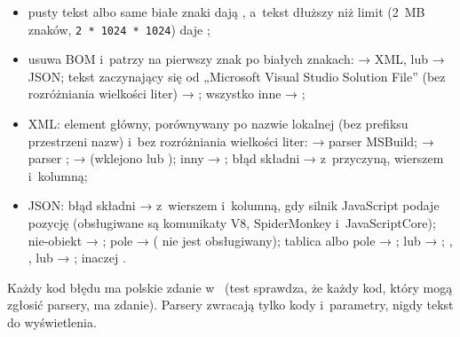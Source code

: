 \begin{itemize}
  \item pusty tekst albo same białe znaki dają , a~tekst dłuższy niż
        limit  (2~MB znaków, \texttt{2 * 1024 * 1024}) daje
        ;
  \item usuwa BOM i~patrzy na pierwszy znak po białych znakach: \repopath{<} → XML,
        \repopath{\{} lub \repopath{[} → JSON; tekst zaczynający się od
        „Microsoft Visual Studio Solution File” (bez rozróżniania wielkości liter) →
        ; wszystko inne → ;
  \item XML: element główny, porównywany po nazwie lokalnej (bez prefiksu przestrzeni nazw)
        i~bez rozróżniania wielkości liter:  → parser MSBuild;  → parser
        ;  → 
        (wklejono  lub ); inny →
        ; błąd składni →  z~przyczyną,
        wierszem i~kolumną;
  \item JSON: błąd składni →  z~wierszem i~kolumną, gdy silnik
        JavaScript podaje pozycję (obsługiwane są komunikaty V8, SpiderMonkey
        i~JavaScriptCore); nie-obiekt → ; pole
         → 
        ( nie jest obsługiwany); tablica  albo
        pole  → ;  lub
         → ; ,
        ,  lub  →
        ; inaczej .
\end{itemize}

Każdy kod błędu ma polskie zdanie w~ (test sprawdza, że każdy kod,
który mogą zgłosić parsery, ma zdanie). Parsery zwracają tylko kody i~parametry, nigdy tekst
do wyświetlenia.


